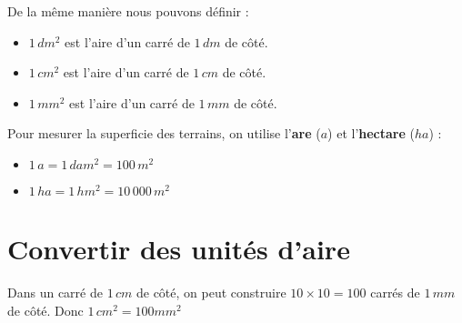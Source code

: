 \begin{pageCours}
\begin{Rq}
De la même manière nous pouvons définir :
\begin{itemize}
\item $1\,dm^2$ est l'aire d'un carré de $1\,dm$ de côté.
\item $1\,cm^2$ est l'aire d'un carré de $1\,cm$ de côté.
\item $1\,mm^2$ est l'aire d'un carré de $1\,mm$ de côté.
\end{itemize}
\end{Rq}

\begin{Voc}
Pour mesurer la superficie des terrains, on utilise l'\textbf{are} ($a$) et l'\textbf{hectare} ($ha$) :
\begin{itemize}
\item $1\,a=1\,dam^2=100\,m^2$
\item $1\,ha=1\,hm^2=10\,000\,m^2$
\end{itemize}
\end{Voc}

\section{Convertir des unités d'aire}

\begin{Pp}
Dans un carré de $1 \,cm$ de côté, on peut construire $10\times10=100$ carrés de $1\, mm$ de côté.
Donc $1 \,cm^2 = 100 mm^2$


\end{Pp}
\end{pageCours}
